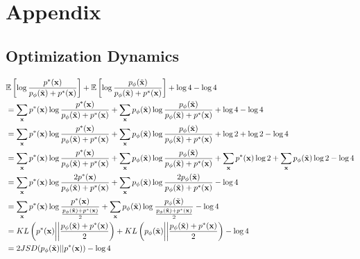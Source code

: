 \section{Appendix}


\subsection{Optimization Dynamics}
\label{sec:proof-for-jsd-thing}
\begin{small}
  \begin{align}
    & \mathbb{E}\left[\log{{\pt \over \pg + \pt}}\right] + \mathbb{E}\left[\log{\pg\over\pg + \pt}\right] + \log4 - \log4 \\
    & = \sum_{\*x}\pt\log{\pt \over \pg + \pt} + \sum_{\*x}\pg\log{\pg \over \pg + \pt} + \log4 - \log4 \\
    & = \sum_{\*x}\pt\log{\pt \over \pg + \pt} + \sum_{\*x}\pg\log{\pg \over \pg + \pt} + \log2 + \log2 - \log4 \\
    & = \sum_{\*x}\pt\log{\pt \over \pg + \pt} + \sum_{\*x}\pg\log{\pg \over \pg + \pt} + \sum_{\*x}\pt\log2 + \sum_{\*x}\pg\log2 - \log4 \\
    & = \sum_{\*x}\pt\log{2\pt \over \pg + \pt} + \sum_{\*x}\pg\log{2\pg \over \pg + \pt} - \log4 \\
    & = \sum_{\*x}\pt\log{\pt \over {\pg + \pt \over 2}} + \sum_{\*x}\pg\log{\pg \over {\pg + \pt \over 2}} - \log4 \\
    & = KL \left( \pt  \middle|\middle| {\pg + \pt \over 2} \right) + KL \left( \pg \middle|\middle| {\pg+\pt \over 2} \right) - \log4 \\
    & = 2JSD(\pg || \pt) - \log4
  \end{align}
\end{small}

